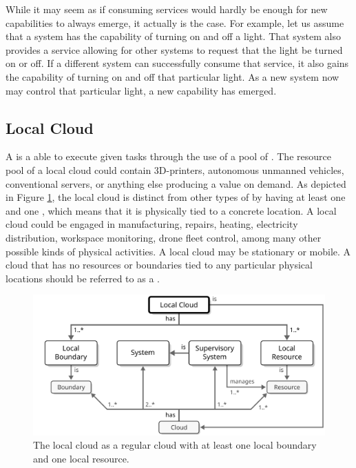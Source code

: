 While it may seem as if consuming services would hardly be enough for new capabilities to always emerge, it actually is the case.
For example, let us assume that a system has the capability of turning on and off a light.
That system also provides a service allowing for other systems to request that the light be turned on or off.
If a different system can successfully consume that service, it also gains the capability of turning on and off that particular light.
As a new system now may control that particular light, a new capability has emerged.

\subsection{Local Cloud}
\label{sec:concepts:local-cloud}

A  is a  able to execute given tasks through the use of a pool of .
The resource pool of a local cloud could contain 3D-printers, autonomous unmanned vehicles, conventional servers, or anything else producing a value on demand.
As depicted in Figure \ref{fig:local-cloud}, the local cloud is distinct from other types of  by having at least one  and one , which means that it is physically tied to a concrete location.
A local cloud could be engaged in manufacturing, repairs, heating, electricity distribution, workspace monitoring, drone fleet control, among many other possible kinds of physical activities.
A local cloud may be stationary or mobile.
A cloud that has no resources or boundaries tied to any particular physical locations should be referred to as a .

\vfill

\begin{figure}[ht!]
  \centering
  \includegraphics[scale=0.9]{figures/local-cloud}
  \caption{
    The local cloud as a regular cloud with at least one local boundary and one local resource.
  }
  \label{fig:local-cloud}
\end{figure}

